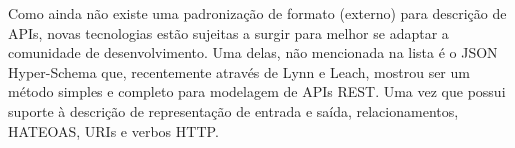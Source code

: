 Como ainda não existe uma padronização de formato (externo) para descrição de APIs, novas tecnologias estão sujeitas a surgir para melhor se adaptar a comunidade de desenvolvimento. Uma delas, não mencionada na lista é o JSON Hyper-Schema que, recentemente através de Lynn e Leach, mostrou ser um método simples e completo para modelagem de APIs REST. Uma vez que possui suporte à descrição de representação de entrada e saída, relacionamentos, HATEOAS, URIs e verbos HTTP. \cite{LynnEtAl2016,Leach2014}
